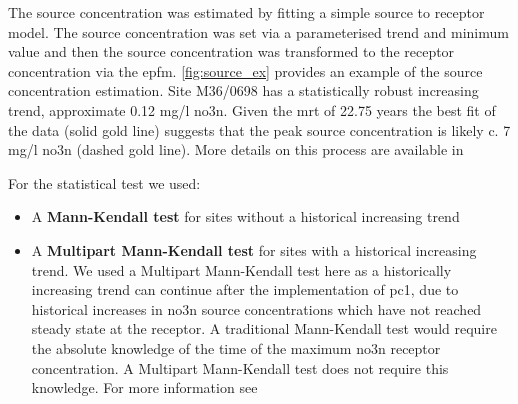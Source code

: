 The source concentration was estimated by fitting a simple source to receptor model. The source concentration was set via a parameterised trend and minimum value and then the source concentration was transformed to the receptor concentration via the \gls{epfm}. \autoref{fig:source_ex} provides an example of the source concentration estimation. Site M36/0698 has a statistically robust increasing trend, approximate 0.12 mg/l \gls{no3n}. Given the \gls{mrt} of 22.75 years the best fit of the data (solid gold line) suggests that the peak source concentration is likely c. 7 mg/l \gls{no3n} (dashed gold line). More details on this process are available in %


For the statistical test we used:
\begin{itemize}
    \item A \textbf{Mann-Kendall test} for sites without a historical increasing trend
    \item A \textbf{Multipart Mann-Kendall test} for sites with a historical increasing trend. We used a Multipart Mann-Kendall test here as a historically increasing trend can continue after the implementation of \gls{pc1}, due to historical increases in \gls{no3n} source concentrations which have not reached steady state at the receptor. A traditional Mann-Kendall test would require the absolute knowledge of the time of the maximum \gls{no3n} receptor concentration. A Multipart Mann-Kendall test does not require this knowledge. For more information see %
\end{itemize}

